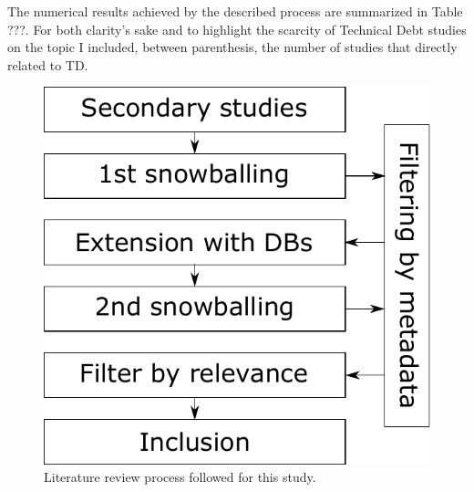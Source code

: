 The numerical results achieved by the described process are summarized in Table ???. For both clarity's sake and to highlight the scarcity of Technical Debt studies on the topic I included, between parenthesis, the number of studies that directly related to TD.

\begin{figure}[ht]
    \centering
    \includegraphics[]{figure/literature_review_process.pdf}
    \caption{Literature review process followed for this study.}
    \label{fig:literature_review_process}
\end{figure}
    


